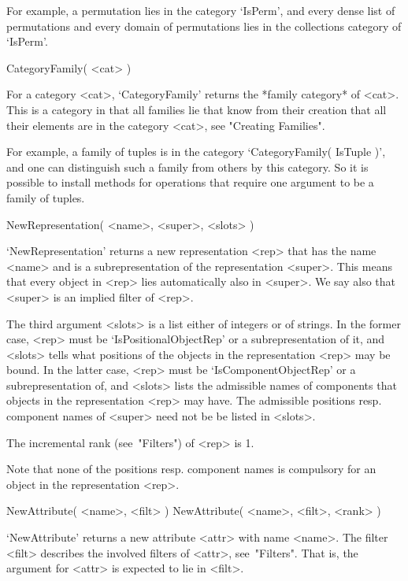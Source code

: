 For example, a permutation lies in the category `IsPerm',
and every dense list of permutations and every domain of permutations
lies in the collections category of `IsPerm'.

\>CategoryFamily( <cat> )

For a category <cat>,
`CategoryFamily' returns the *family category* of <cat>.
This is a category in that all families lie that know from their
creation that all their elements are in the category <cat>,
see "Creating Families".

For example, a family of tuples is in the category
`CategoryFamily( IsTuple )',
and one can distinguish such a family from others by this category.
So it is possible to install methods for operations that require one
argument to be a family of tuples.



\>NewRepresentation( <name>, <super>, <slots> )

`NewRepresentation' returns a new representation <rep> that has the name
<name> and is a subrepresentation of the representation <super>.
This means that every object in <rep> lies automatically also in <super>.
We say also that <super> is an implied filter of <rep>.

The third argument <slots> is a list either of integers or of strings.
In the former case, <rep> must be `IsPositionalObjectRep' or a
subrepresentation of it, and <slots> tells what positions of the objects
in the representation <rep> may be bound.
In the latter case, <rep> must be `IsComponentObjectRep' or a
subrepresentation of, and <slots> lists the admissible names of
components that objects in the representation <rep> may have.
The admissible positions resp. component names of <super> need not be
be listed in <slots>.

The incremental rank (see~"Filters") of <rep> is 1.

Note that none of the positions resp. component names is compulsory for
an object in the representation <rep>.



\>NewAttribute( <name>, <filt> )
\)NewAttribute( <name>, <filt>, <rank> )

`NewAttribute' returns a new attribute <attr> with name <name>.
The filter <filt> describes the involved filters of <attr>,
see~"Filters".
That is, the argument for <attr> is expected to lie in <filt>.

